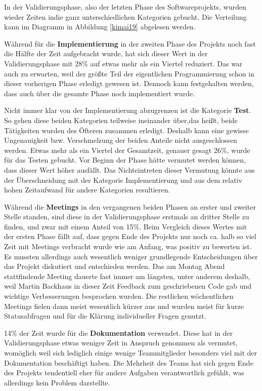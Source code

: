 \documentclass[../review_3.tex]{subfiles}
\begin{document}
In der Validierungsphase, also der letzten Phase des Softwareprojekts, wurden wieder Zeiten indie  ganz unterschiedlichen Kategorien gebucht. Die Verteilung kann im Diagramm in Abbildung \ref{kimai19} abgelesen werden.

Während für die \textbf{Implementierung} in der zweiten Phase des Projekts noch fast die Hälfte der Zeit aufgebracht wurde, hat sich dieser Wert in der Validierungsphase mit 28\% auf etwas mehr als ein Viertel reduziert. Das war auch zu erwarten, weil der größte Teil der eigentlichen Programmierung schon in dieser vorherigen Phase erledigt gewesen ist. Dennoch kann festgehalten werden, dass auch über die gesamte Phase noch implementiert wurde.

Nicht immer klar von der Implementierung abzugrenzen ist die Kategorie \textbf{Test}. So gehen diese beiden Kategorien teilweise ineinander über,das heißt, beide Tätigkeiten wurden des Öfteren zusammen erledigt. Deshalb kann eine gewisse Ungenauigkeit bzw. Verschmelzung der beiden Anteile nicht ausgeschlossen werden. Etwas mehr als ein Viertel der Gesamtzeit, genauer gesagt 26\%, wurde für das Testen gebucht. Vor Beginn der Phase hätte vermutet werden können, dass dieser Wert höher ausfällt. Das Nichteintreten dieser Vermutung könnte aus der Überschneidung mit der Kategorie Implementierung und aus dem relativ hohen Zeitaufwand für andere Kategorien resultieren.

Während die \textbf{Meetings} in den vergangenen beiden Phasen an erster und zweiter Stelle standen, sind diese in der Validierungsphase erstmals an dritter Stelle zu finden, und zwar mit einem Anteil von 15\%. Beim Vergleich dieses Wertes mit der ersten Phase fällt auf, dass gegen Ende des Projekts nur noch ca. halb so viel Zeit mit Meetings verbracht wurde wie am Anfang, was positiv zu bewerten ist. Es mussten allerdings auch wesentlich weniger grundlegende Entscheidungen über das Projekt diskutiert und entschieden werden. Das am Montag Abend stattfindende Meeting dauerte fast immer am längsten, unter anderem deshalb, weil Martin Backhaus in dieser Zeit Feedback zum geschriebenen Code gab und wichtige Verbesserungen besprochen wurden. Die restlichen wöchentlichen Meetings fielen dann meist wesentlich kürzer aus und wurden meist für kurze Statusabfragen und für die Klärung individueller Fragen genutzt.

14\% der Zeit wurde für die \textbf{Dokumentation} verwendet. Diese hat in der Validierungsphase etwas weniger Zeit in Anspruch genommen als vermutet, womöglich weil sich lediglich einige wenige Teammitglieder besonders viel mit der Dokumentation beschäftigt haben. Die Mehrheit des Teams hat sich gegen Ende des Projekts tendentiell eher für andere Aufgaben verantwortlich gefühlt, was allerdings kein Problem darstellte.
\end{document}

